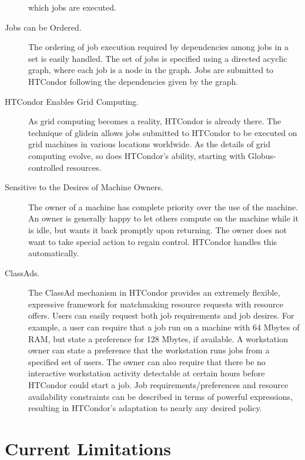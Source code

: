 \begin{description}
which jobs are executed.
	\item[Jobs can be Ordered.] The ordering of job execution
required by dependencies among jobs in a set is easily handled.
The set of jobs is specified using a directed acyclic graph,
where each job is a node in the graph.
Jobs are submitted to HTCondor following the dependencies given
by the graph.
	\item[HTCondor Enables Grid Computing.] As grid computing
becomes a reality, HTCondor is already there.
The technique of glidein allows jobs submitted to HTCondor
to be executed on grid machines in various locations worldwide.
As the details of grid computing evolve, so does HTCondor's
ability, starting with Globus-controlled resources.
	\item[Sensitive to the Desires of Machine Owners.] The
owner of a machine has complete priority over the use
of the machine.
An owner is generally happy to let others compute on
the machine while it is idle, but wants it back
promptly upon returning. The owner does not want to take special
action to regain control. HTCondor handles this automatically. 
	\item[ClassAds.]The ClassAd mechanism 
in HTCondor provides an extremely
flexible, expressive framework for matchmaking
resource requests with resource offers.
Users can easily request both job requirements and job desires.
For example, a user can require that a job run on a machine
with 64 Mbytes of RAM,
but state a preference for 128 Mbytes, if available.
A workstation owner
can state a preference that the workstation runs jobs
from a specified set of users. 
The owner can also require that there be no interactive workstation
activity detectable at certain hours before HTCondor could
start a job.
Job requirements/preferences and resource availability constraints can be
described in terms of powerful expressions, resulting in
HTCondor's adaptation to nearly any desired policy. 
\end{description}

\section{\label{sec:current-limitations}Current Limitations}

